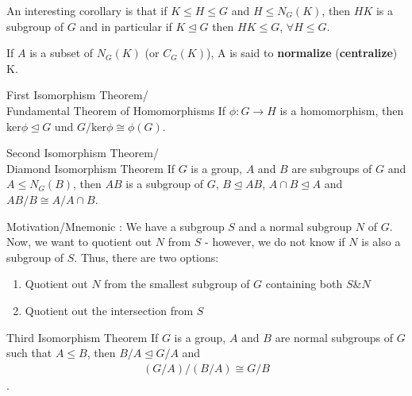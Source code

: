 \documentclass[titlepage, 12pt]{book}
\begin{document}
An interesting corollary is that if $ K \le H \le G$ and
$H\le N_G(K)$, then $HK$ is a subgroup of $G$ and in particular if
$K\trianglelefteq G$ then $HK\le G$, $\forall H\le G$.
\begin{definition}{}{}
    If $A$ is a subset of $N_G(K)$ (or $C_G(K)$), A is said to
    \textbf{normalize} (\textbf{centralize}) K.
\end{definition}
\begin{theorem}{First Isomorphism Theorem/\\Fundamental Theorem of Homomorphisms}{}
    If $\phi:G\rightarrow H$ is a homomorphism, then ker$\phi\trianglelefteq G$
    und $G/\text{ker}\phi\cong \phi(G)$.
\end{theorem}
\begin{theorem}{Second Isomorphism Theorem/\\Diamond Isomorphism Theorem}{}
    If $G$ is a group, $A$ and $B$ are subgroups of $G$ and $A\le N_G(B)$, then
    $AB$ is a subgroup of $G$, $B\trianglelefteq AB$, $A\cap B\trianglelefteq A$
    and $AB/B\cong A/A\cap B$.
\end{theorem}
Motivation/Mnemonic : We have a subgroup $S$ and a normal subgroup $N$ of $G$.
Now, we want to quotient out $N$ from $S$ - however, we do not know if $N$ is
also a subgroup of $S$. Thus, there are two options:
\begin{enumerate}
    \item Quotient out $N$ from the smallest subgroup of $G$ containing both
        $S$\&$N$
    \item Quotient out the intersection from $S$
\end{enumerate}
\begin{theorem}{Third Isomorphism Theorem}{}
    If $G$ is a group, $A$ and $B$ are normal subgroups of $G$ such that $A\le
    B$, then $B/A\trianglelefteq G/A$ and 
    \begin{align*}
        (G/A)/(B/A) \cong G/B
    \end{align*}.
\end{theorem}
\end{document}
